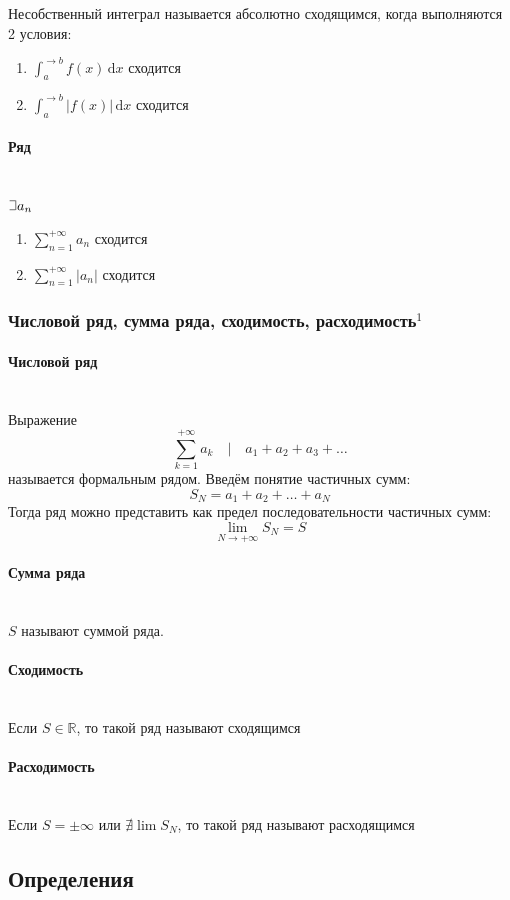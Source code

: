 \documentclass{article}
\def\letus{%
\mathord{\setbox0=\hbox{$\exists$}%
         \hbox{\kern 0.125\wd0%
               \vbox to \ht0{%
                  \hrule width 0.75\wd0%
                  \vfill%
                  \hrule width 0.75\wd0}%
               \vrule height \ht0%
               \kern 0.125\wd0}%
       }%
        }
\def\D{\,\mathrm{d}}
\let\vanillaparagraph\paragraph
\renewcommand{\paragraph}[1]{\vanillaparagraph{#1}\mbox{}\\}
\begin{document}
Несобственный интеграл называется абсолютно сходящимся, когда выполняются 2 условия:
\begin{enumerate}
    \item $\int_a^{\rightarrow b} f(x) \D x$ сходится
    \item $\int_a^{\rightarrow b} |f(x)| \D x$ сходится
\end{enumerate}

\paragraph{Ряд}
$\letus a_n$
\begin{enumerate}
    \item $\sum_{n=1}^{+\infty} a_n$ сходится
    \item $\sum_{n=1}^{+\infty} |a_n|$ сходится
\end{enumerate}

\subsubsection{Числовой ряд, сумма ряда, сходимость, расходимость\texorpdfstring{$^1$}{}}
\paragraph{Числовой ряд}
Выражение
$$
\sum_{k=1}^{+\infty} a_k \quad | \quad a_1+a_2+a_3+\ldots
$$
называется формальным рядом. Введём понятие частичных сумм:
$$
S_N = a_1+a_2+\ldots+a_N
$$
Тогда ряд можно представить как предел последовательности частичных сумм:
$$
\lim_{N\rightarrow +\infty} S_N = S
$$

\paragraph{Сумма ряда}
$S$ называют суммой ряда.
\paragraph{Сходимость}
Если $S \in \mathbb{R}$, то такой ряд называют сходящимся
\paragraph{Расходимость}
Если $S = \pm\infty$ или $\nexists \lim S_N$, то такой ряд называют расходящимся



\newpage
\subsection{Определения}
\end{document}
